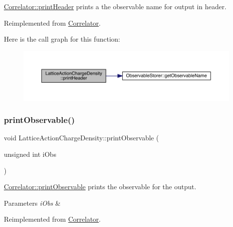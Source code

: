 \mbox{\hyperlink{class_correlator_ac7c5a07d7cbee97c417a1659b93083b2}{Correlator\+::print\+Header}} prints a the observable name for output in header. 



Reimplemented from \mbox{\hyperlink{class_correlator_ac7c5a07d7cbee97c417a1659b93083b2}{Correlator}}.

Here is the call graph for this function\+:\nopagebreak
\begin{figure}[H]
\begin{center}
\leavevmode
\includegraphics[width=350pt]{class_lattice_action_charge_density_a2a7a806862f23975161316a37f47f22e_cgraph}
\end{center}
\end{figure}
\mbox{\label{class_lattice_action_charge_density_abb7db718d4069faab0ed19f31aa85ad4}} 
\subsubsection{\texorpdfstring{printObservable()}{printObservable()}}
{\footnotesize\ttfamily void Lattice\+Action\+Charge\+Density\+::print\+Observable (\begin{DoxyParamCaption}\item[{unsigned int}]{i\+Obs }\end{DoxyParamCaption})\hspace{0.3cm}{\ttfamily [virtual]}}



\mbox{\hyperlink{class_correlator_a15744ddb9f2b71fff34ac762d101df38}{Correlator\+::print\+Observable}} prints the observable for the output. 


\begin{DoxyParams}{Parameters}
{\em i\+Obs} & \\
\hline
\end{DoxyParams}


Reimplemented from \mbox{\hyperlink{class_correlator_a15744ddb9f2b71fff34ac762d101df38}{Correlator}}.

